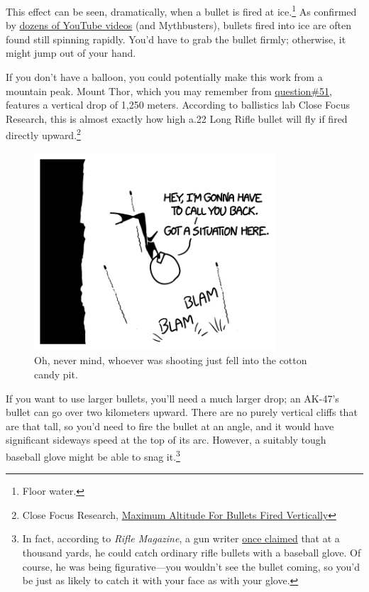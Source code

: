 {{This effect can be seen, dramatically, when a bullet is fired at ice.{\footnote{Floor water.} } As confirmed by \href{https://www.youtube.com/results?search\_query=bullet\%20spinning\%20ice}{dozens of YouTube videos} (and Mythbusters), bullets fired into ice are often found still spinning rapidly. You'd have to grab the bullet firmly; otherwise, it might jump out of your hand.}

{If you don't have a balloon, you could potentially make this work from a mountain peak. Mount Thor, which you may remember from \href{http://what-if.xkcd.com/51/}{question\#51}, features a vertical drop of 1,250 meters. According to ballistics lab Close Focus Research, this is almost exactly how high a.22 Long Rifle bullet will fly if fired directly upward.{\footnote{Close Focus Research, \href{http://www.closefocusresearch.com/maximum-altitude-bullets-fired-vertically} {Maximum Altitude For Bullets Fired Vertically}} } }

\begin{figure}[!htbp]
\centering
\includegraphics[scale=0.5, max width=0.8\textwidth]{imgs/a/81/catch_thor.png}
\caption{Oh, never mind, whoever was shooting just fell into the cotton candy pit.}
\end{figure}

{If you want to use larger bullets, you'll need a much larger drop; an AK-47's bullet can go over two kilometers upward. There are no purely vertical cliffs that are that tall, so you'd need to fire the bullet at an angle, and it would have significant sideways speed at the top of its arc. However, a suitably tough baseball glove might be able to snag it.{\footnote{In fact, according to \emph{Rifle Magazine}, a gun writer \href{https://www.riflemagazine.com/magazine/article.cfm?magid=78&tocid=1094}{once claimed} that at a thousand yards, he could catch ordinary rifle bullets with a baseball glove. Of course, he was being figurative—you wouldn't see the bullet coming, so you'd be just as likely to catch it with your face as with your glove.} } }

}
